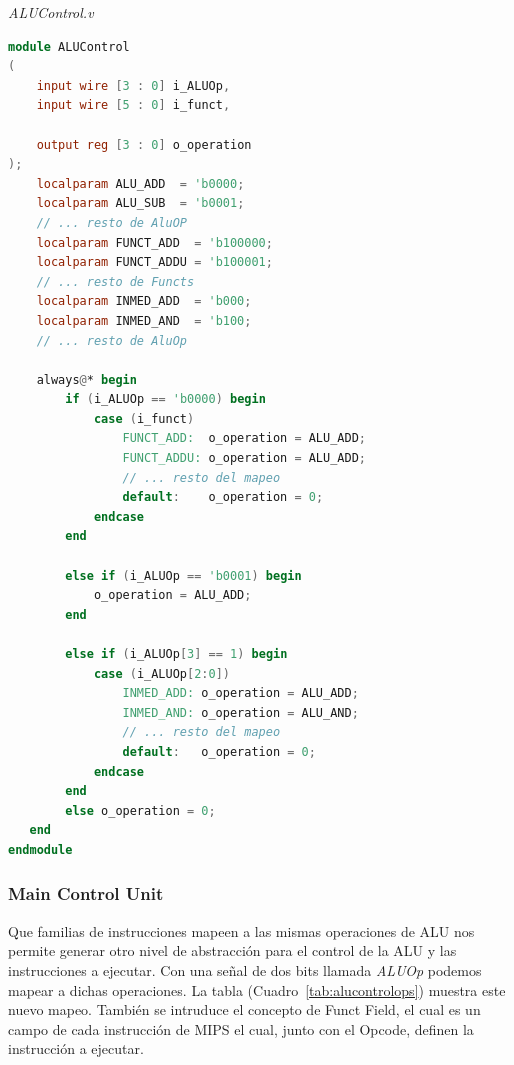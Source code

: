 \documentclass[12pt]{article}
\begin{document}
\noindent \textit{ALUControl.v}
\begin{lstlisting}[language=verilog]
module ALUControl
(
    input wire [3 : 0] i_ALUOp,
    input wire [5 : 0] i_funct,

    output reg [3 : 0] o_operation
);
    localparam ALU_ADD  = 'b0000;
    localparam ALU_SUB  = 'b0001;
    // ... resto de AluOP
    localparam FUNCT_ADD  = 'b100000;
    localparam FUNCT_ADDU = 'b100001;
    // ... resto de Functs
    localparam INMED_ADD  = 'b000;
    localparam INMED_AND  = 'b100;
    // ... resto de AluOp

    always@* begin
        if (i_ALUOp == 'b0000) begin
            case (i_funct)
                FUNCT_ADD:  o_operation = ALU_ADD;
                FUNCT_ADDU: o_operation = ALU_ADD;
                // ... resto del mapeo
                default:    o_operation = 0;
            endcase
        end

        else if (i_ALUOp == 'b0001) begin
            o_operation = ALU_ADD;
        end

        else if (i_ALUOp[3] == 1) begin
            case (i_ALUOp[2:0])
                INMED_ADD: o_operation = ALU_ADD;
                INMED_AND: o_operation = ALU_AND;
                // ... resto del mapeo
                default:   o_operation = 0;
            endcase
        end
        else o_operation = 0;
   end
endmodule
\end{lstlisting}

\subsubsection{Main Control Unit}

Que familias de instrucciones mapeen a las mismas operaciones de ALU nos permite generar otro nivel de abstracción para el control de la ALU y las instrucciones a ejecutar. Con una señal de dos bits llamada \textit{ALUOp} podemos mapear a dichas operaciones. La tabla (Cuadro~\ref{tab:alucontrolops}) muestra este nuevo mapeo. También se intruduce el concepto de Funct Field, el cual es un campo de cada instrucción de MIPS el cual, junto con el Opcode, definen la instrucción a ejecutar.
\end{document}
